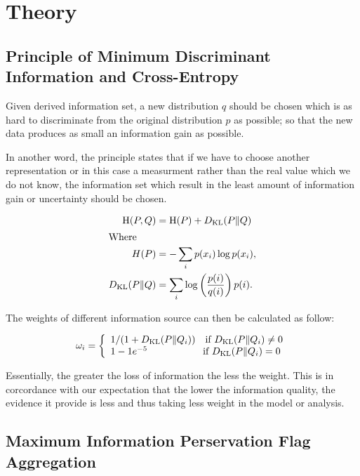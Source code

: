 \documentclass[nojss]{jss}
\begin{document}
\section{Theory}


\subsection{Principle of Minimum Discriminant Information and Cross-Entropy}

Given derived information set, a new distribution $q$ should be chosen
which is as hard to discriminate from the original distribution $p$ as
possible; so that the new data produces as small an information gain
as possible.

In another word, the principle states that if we have to choose
another representation or in this case a measurment rather than the
real value which we do not know, the information set which result in
the least amount of information gain or uncertainty should be chosen.


\begin{align*}
  \mathrm{H}(P, Q) &=  \mathrm{H}(P) + D_{\mathrm{KL}}(P \| Q)\\
  \intertext{Where}
  H(P) &= -\sum_{i} {p(x_i) \log p(x_i)},\\
  D_{\mathrm{KL}}(P\|Q) &= \sum_i \log\left(\frac{p(i)}{q(i)}\right) p(i).\\
\end{align*}


The weights of different information source can then be calculated as
follow:

\begin{equation*}
  \omega_i = \left\{
  \begin{array}{l r}
    1/(1 + D_{\mathrm{KL}}(P\|Q_i)) \quad \text{if $D_{\mathrm{KL}}(P\|Q_i) \ne 0$}\\
    1 - 1e^{-5} \, \, \, \, \quad \quad \quad \quad \quad \text{if $D_{\mathrm{KL}}(P\|Q_i) = 0$}
  \end{array} \right.
\end{equation*}


Essentially, the greater the loss of information the less the
weight. This is in corcordance with our expectation that the lower the
information quality, the evidence it provide is less and thus taking
less weight in the model or analysis.



\subsection{Maximum Information Perservation Flag Aggregation}
\end{document}
